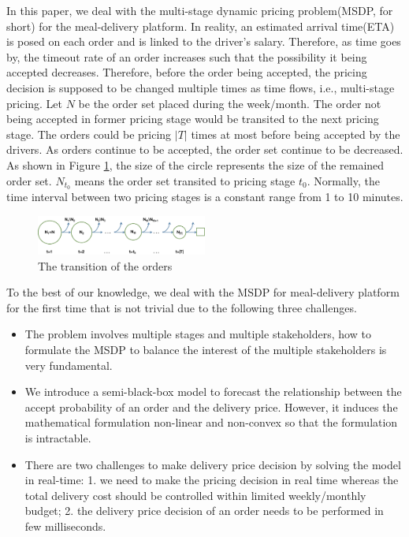 \documentclass[sigconf,authordraft]{acmart}
\begin{document}
In this paper, we deal with the multi-stage dynamic pricing problem(MSDP, for short) for the meal-delivery platform. In reality, an estimated arrival time(ETA) is posed on each order and is linked to the driver's salary. Therefore, as time goes by, the timeout rate of an order increases such that the possibility it being accepted decreases. Therefore, before the order being accepted, the pricing decision is supposed to be changed multiple times as time flows, i.e., multi-stage pricing. Let $N$ be the order set placed during the week/month. The order not being accepted in former pricing stage would be transited to the next pricing stage. The orders could be pricing $|T|$ times at most before being accepted by the drivers. As orders continue to be accepted, the order set continue to be decreased. As shown in Figure \ref{fig:orders}, the size of the circle represents the size of the remained order set. $N_{t_0}$ means the order set transited to pricing stage $t_0$. Normally, the time interval between two pricing stages is a constant range from 1 to 10 minutes.
\begin{figure}[h]
  \centering
  \includegraphics[width=0.5\textwidth]{orders.png}
  \caption{The transition of the orders}
  \label{fig:orders}
\end{figure}
To the best of our knowledge, we deal with the MSDP for meal-delivery platform for the first time that is not trivial due to the following three challenges.
\begin{itemize}
\item The problem involves multiple stages and multiple stakeholders, how to formulate the MSDP to balance the interest of the multiple stakeholders is very fundamental.
\item We introduce a semi-black-box model to forecast the relationship between the accept probability of an order and the delivery price. However, it induces the mathematical formulation non-linear and non-convex so that the formulation is intractable.
\item There are two challenges to make delivery price decision by solving the model in real-time: 1. we need to make the pricing decision in real time whereas the total delivery cost should be controlled within limited weekly/monthly budget; 2. the delivery price decision of an order needs to be performed in few milliseconds.
\end{itemize}
\end{document}
